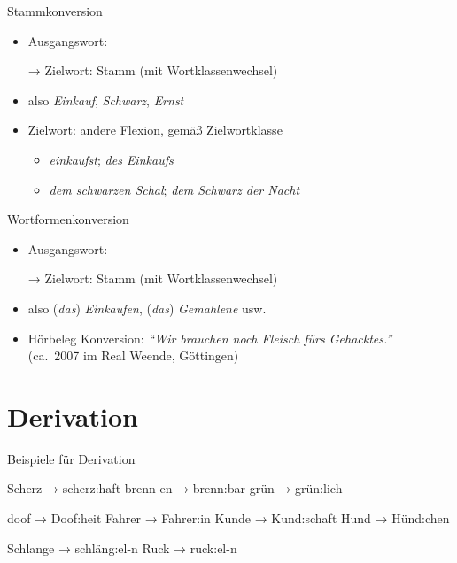 \begin{frame}
  {Stammkonversion}
  \pause
  \begin{itemize}[<+->]
    \item Ausgangswort: 
    \item[→] Zielwort: Stamm \alert{(mit Wortklassenwechsel)}
      \Halbzeile
    \item also \textit{Einkauf}, \textit{Schwarz}, \textit{Ernst}
      \Halbzeile
    \item Zielwort: andere Flexion, gemäß Zielwortklasse
      \begin{itemize}[<+->]
        \item \textit{einkaufst}; \textit{des Einkaufs}
        \item \textit{dem schwarzen Schal}; \textit{dem Schwarz der Nacht}
      \end{itemize}
  \end{itemize}
\end{frame}

\begin{frame}
  {Wortformenkonversion}
  \pause
  \begin{itemize}[<+->]
    \item Ausgangswort: 
    \item[→] Zielwort: Stamm \alert{(mit Wortklassenwechsel)}
      \Halbzeile
    \item also (\textit{das}) \textit{Einkaufen}, (\textit{das}) \textit{Gemahlene} usw.
      \Halbzeile
    \item Hörbeleg Konversion: \textit{"`Wir brauchen noch Fleisch fürs Gehacktes."'}\\
      (ca.\ 2007 im Real Weende, Göttingen)
  \end{itemize}
\end{frame}

\section{Derivation}

\begin{frame}
  {Beispiele für Derivation}
  \pause
  \begin{exe}
    \ex
    \begin{xlist}
      \ex Scherz → scherz\alert{:haft}
      \pause
      \ex brenn-en → brenn\alert{:bar}
      \pause
      \ex grün → grün\alert{:lich}
    \end{xlist}
    \pause
    \Halbzeile
    \ex
    \begin{xlist}
      \ex doof → Doof\alert{:heit}
      \pause
      \ex Fahrer → Fahrer\alert{:in}
      \pause
      \ex Kunde → Kund\alert{:schaft}
      \pause
      \ex Hund → Hünd\alert{:chen}
    \end{xlist}
    \pause
    \Halbzeile
    \ex
    \begin{xlist}
      \ex Schlange → schläng\alert{:el}-n
      \pause
      \ex Ruck → ruck\alert{:el}-n
    \end{xlist}
  \end{exe}
\end{frame}

